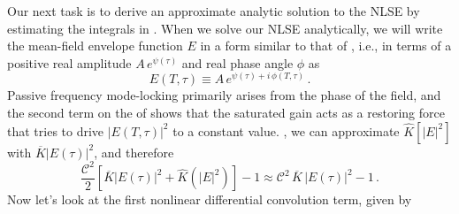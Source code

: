 
Our next task is to derive an approximate analytic solution to the NLSE by estimating the integrals in . When we solve our NLSE analytically, we will write the mean-field envelope function $E$ in a form similar to that of , i.e., in terms of a positive real amplitude $A\, e^{\psi(\tau)}$ and real phase angle $\phi$ as
\begin{equation} \label{eqn:mflt_field_ansatz}
    E(T, \tau) \equiv A\, e^{\psi(\tau) + i\, \phi(T, \tau)}\, .
\end{equation}
Passive frequency mode-locking primarily arises from the phase of the field, and the second term on the \rhs of  shows that the saturated gain acts as a restoring force that tries to drive $|E(T, \tau)|^2$ to a constant value. , we can approximate $\widehat{K}\left[|E|^2\right]$ with $\overline{K} \left| E(\tau)\right|^2$, and therefore
\begin{equation} \label{eqn:mflt_mean_sat}
    \frac{\mathcal{C}^2}{2} \left[\overline{K} \left|E(\tau)\right|^2 + \widehat{K}\left(|E|^2\right)\right] - 1 \approx \mathcal{C}^2\, \overline{K}\, \left| E(\tau)\right|^2 - 1\, .
\end{equation}
Now let's look at the first nonlinear differential convolution term, given by
